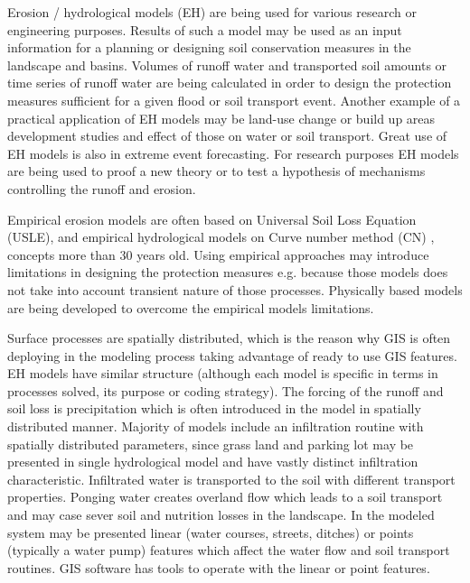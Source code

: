 Erosion / hydrological models (EH) are being used for various research or engineering purposes. 
Results of such a model may be used as an input information for a planning 
or designing soil conservation measures in the landscape and basins. 
Volumes of runoff water and transported soil amounts
or time series of runoff water are being calculated
in order to design the protection measures sufficient for a given flood 
or soil transport event. Another example of a practical 
application of EH models may be land-use change or build up areas development studies 
and effect of those on water or soil transport. 
Great use of EH models is also in extreme event 
forecasting. For research purposes EH models 
are being used to proof a new theory or to test a hypothesis of mechanisms controlling the runoff and erosion.

Empirical erosion models are often based on Universal Soil Loss Equation (USLE), 
\cite{wischmeier1978,renard1997} and empirical hydrological models on Curve 
number method (CN) \cite{cronshey1986}, concepts more than 30 years old. 
Using empirical approaches may introduce limitations in designing the protection measures e.g. 
because those models does not take into account transient nature of those processes. 
Physically based models are being developed to overcome the empirical models limitations. 

Surface processes are spatially distributed, which is the reason why GIS 
is often deploying in the modeling process taking advantage 
of ready to use GIS features. EH models have similar structure 
(although each model is specific in terms in processes solved, 
its purpose or coding strategy). The forcing of the runoff and soil loss is precipitation
which is often introduced in the model in spatially distributed 
manner. Majority of models include an infiltration routine with 
spatially distributed parameters, since grass land 
and parking lot may be presented in single hydrological model 
and have vastly distinct infiltration characteristic. Infiltrated 
water is transported to the soil with different transport properties. 
Ponging water creates overland flow which leads to a soil transport 
and may case sever soil and nutrition losses in the landscape. 
In the modeled system may be presented linear (water courses, streets, ditches) 
or points (typically a water pump) features which affect the water 
flow and soil transport routines. GIS software has tools 
to operate with the linear or point features.


